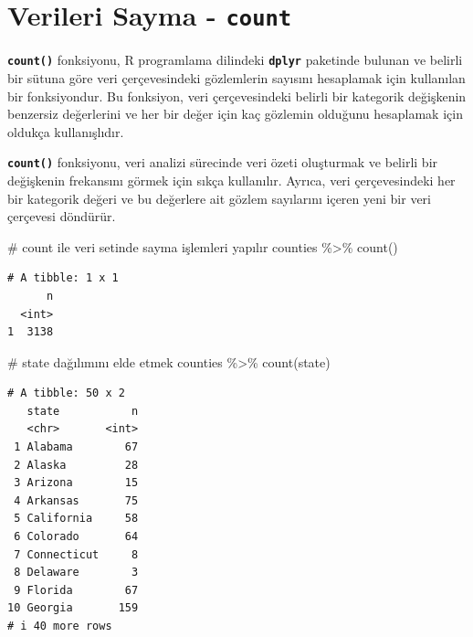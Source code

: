 \documentclass[
  letterpaper,
  DIV=11,
  numbers=noendperiod]{scrreprt}
\newenvironment{Shaded}{\begin{snugshade}}{\end{snugshade}}
\newcommand{\CommentTok}[1]{\textcolor[rgb]{0.37,0.37,0.37}{#1}}
\newcommand{\FunctionTok}[1]{\textcolor[rgb]{0.28,0.35,0.67}{#1}}
\newcommand{\NormalTok}[1]{\textcolor[rgb]{0.00,0.23,0.31}{#1}}
\newcommand{\SpecialCharTok}[1]{\textcolor[rgb]{0.37,0.37,0.37}{#1}}
\begin{document}
\section*{\texorpdfstring{Verileri Sayma -
\texttt{count}}{Verileri Sayma - count}}\label{verileri-sayma---count}


\textbf{\texttt{count()}} fonksiyonu, R programlama dilindeki
\textbf{\texttt{dplyr}} paketinde bulunan ve belirli bir sütuna göre
veri çerçevesindeki gözlemlerin sayısını hesaplamak için kullanılan bir
fonksiyondur. Bu fonksiyon, veri çerçevesindeki belirli bir kategorik
değişkenin benzersiz değerlerini ve her bir değer için kaç gözlemin
olduğunu hesaplamak için oldukça kullanışlıdır.

\textbf{\texttt{count()}} fonksiyonu, veri analizi sürecinde veri özeti
oluşturmak ve belirli bir değişkenin frekansını görmek için sıkça
kullanılır. Ayrıca, veri çerçevesindeki her bir kategorik değeri ve bu
değerlere ait gözlem sayılarını içeren yeni bir veri çerçevesi döndürür.

\begin{Shaded}
\begin{Highlighting}[]
\CommentTok{\# count ile veri setinde sayma işlemleri yapılır}
\NormalTok{counties }\SpecialCharTok{\%\textgreater{}\%}
\FunctionTok{count}\NormalTok{()}
\end{Highlighting}
\end{Shaded}

\begin{verbatim}
# A tibble: 1 x 1
      n
  <int>
1  3138
\end{verbatim}

\begin{Shaded}
\begin{Highlighting}[]
\CommentTok{\# state dağılımını elde etmek}
\NormalTok{counties }\SpecialCharTok{\%\textgreater{}\%}
\FunctionTok{count}\NormalTok{(state)}
\end{Highlighting}
\end{Shaded}

\begin{verbatim}
# A tibble: 50 x 2
   state           n
   <chr>       <int>
 1 Alabama        67
 2 Alaska         28
 3 Arizona        15
 4 Arkansas       75
 5 California     58
 6 Colorado       64
 7 Connecticut     8
 8 Delaware        3
 9 Florida        67
10 Georgia       159
# i 40 more rows
\end{verbatim}
\end{document}
